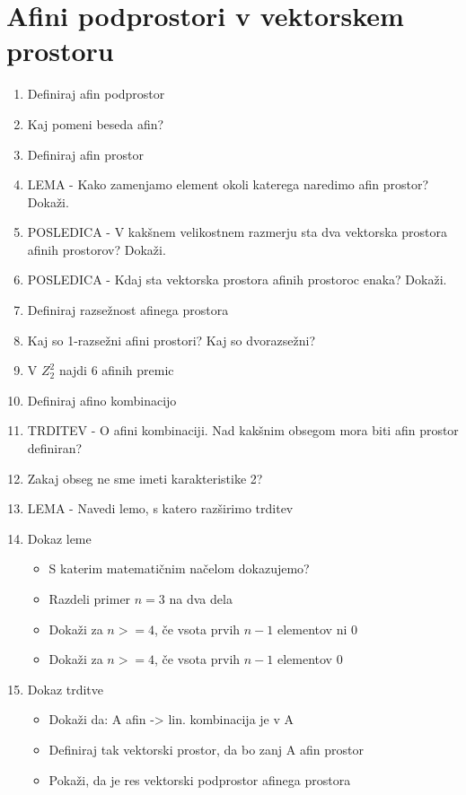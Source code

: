 \documentclass{article}
\begin{document}
    \section{Afini podprostori v vektorskem prostoru}
    \begin{enumerate}
        \item Definiraj afin podprostor
        \item Kaj pomeni beseda afin?
        \item Definiraj afin prostor
        \item LEMA - Kako zamenjamo element okoli katerega naredimo afin prostor? Dokaži.
        \item POSLEDICA - V kakšnem velikostnem razmerju sta dva vektorska prostora afinih prostorov? Dokaži.
        \item POSLEDICA - Kdaj sta vektorska prostora afinih prostoroc enaka? Dokaži.
        \item Definiraj razsežnost afinega prostora
        \item Kaj so 1-razsežni afini prostori? Kaj so dvorazsežni?
        \item V $Z_2^2$ najdi 6 afinih premic
        \item Definiraj afino kombinacijo
        \item TRDITEV - O afini kombinaciji. Nad kakšnim obsegom mora biti afin prostor definiran?
        \item Zakaj obseg ne sme imeti karakteristike 2?
        \item LEMA - Navedi lemo, s katero razširimo trditev
        \item Dokaz leme
        \begin{itemize}
            \item S katerim matematičnim načelom dokazujemo?
            \item Razdeli primer $n = 3$ na dva dela
            \item Dokaži za $n >= 4$, če vsota prvih $n - 1$ elementov ni 0
            \item Dokaži za $n >= 4$, če vsota prvih $n - 1$ elementov 0
        \end{itemize}
        \item Dokaz trditve
        \begin{itemize}
            \item Dokaži da: A afin -> lin. kombinacija je v A
            \item Definiraj tak vektorski prostor, da bo zanj A afin prostor
            \item Pokaži, da je res vektorski podprostor afinega prostora

\end{itemize}
\end{enumerate}
\end{document}
